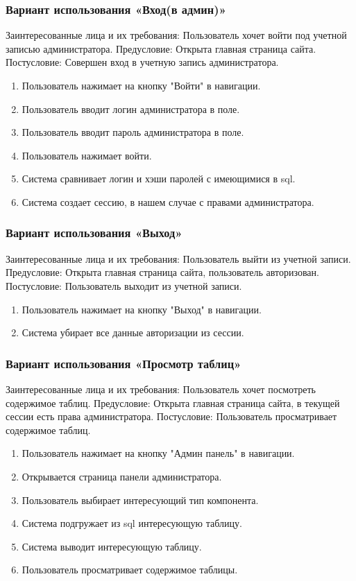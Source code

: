 \subsubsection{Вариант использования «Вход(в админ)»}
Заинтересованные лица и их требования: Пользователь хочет войти под учетной записью администратора.
Предусловие: Открыта главная страница сайта.
Постусловие: Совершен вход в учетную запись администратора.
\begin{enumerate}
	\item Пользователь нажимает на кнопку "Войти" в навигации.
	\item Пользователь вводит логин администратора в поле.
	\item Пользователь вводит пароль администратора в поле.
	\item Пользователь нажимает войти.
	\item Система сравнивает логин и хэши паролей с имеющимися в sql.
	\item Система создает сессию, в нашем случае с правами администратора.
\end{enumerate}

\subsubsection{Вариант использования «Выход»}
Заинтересованные лица и их требования: Пользователь выйти из учетной записи.
Предусловие: Открыта главная страница сайта, пользователь авторизован.
Постусловие: Пользователь выходит из учетной записи.
\begin{enumerate}
	\item Пользователь нажимает на кнопку "Выход" в навигации.
	\item Система убирает все данные авторизации из сессии.
\end{enumerate}

\subsubsection{Вариант использования «Просмотр таблиц»}
Заинтересованные лица и их требования: Пользователь хочет посмотреть содержимое таблиц.
Предусловие: Открыта главная страница сайта, в текущей сессии есть права администратора.
Постусловие: Пользователь просматривает содержимое таблиц.
\begin{enumerate}
	\item Пользователь нажимает на кнопку "Админ панель" в навигации.
	\item Открывается страница панели администратора.
	\item Пользователь выбирает интересующий тип компонента.
	\item Система подгружает из sql интересующую таблицу.
	\item Система выводит интересующую таблицу.
	\item Пользователь просматривает содержимое таблицы.
\end{enumerate}

